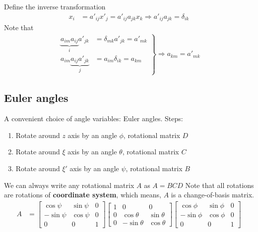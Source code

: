 \documentclass[twoside,9pt]{article}
\numberwithin{equation}{section} %
\theoremstyle{definition}
\theoremstyle{remark}
\begin{document}
Define the inverse transformation
\begin{align}
    x_i &= a'_{ij}x'_j = a'_{ij}a_{jk}x_k\Rightarrow
    a'_{ij}a_{jk} = \delta_{ik}
\end{align}
Note that
\begin{align}
    \left.
    \begin{aligned}
        \underbrace{a_{im}a_{ij}}_i a'_{jk} &= \delta_{mk}a'_{jk} = a'_{mk}\\
        a_{im}\underbrace{a_{ij}a'_{jk}}_j &= a_{im}\delta_{ik} = a_{km}
    \end{aligned}
    \right\}
    \Rightarrow a_{km} = a'_{mk}
\end{align}

\subsection{Euler angles}
A convenient choice of angle variables: Euler angles.
Steps:
\begin{enumerate}
    \item Rotate around $z$ axis by an angle $\phi$, rotational matrix $D$
    \item Rotate around $\xi$ axis by an angle $\theta$, rotational matrix $C$
    \item Rotate around $\xi'$ axis by an angle $\psi$, rotational matrix $B$
\end{enumerate}
We can always write any rotational matrix $A$ as $A = BCD$
Note that all rotations are rotations of \textbf{coordinate system}, which means,
$A$ is a change-of-basis matrix.
\begin{align}
    A &= 
    \begin{bmatrix}
        \cos\psi &  \sin\psi & 0\\
        -\sin\psi & \cos\psi & 0\\
        0 & 0 & 1
    \end{bmatrix}
    \begin{bmatrix}
        1 & 0 & 0\\
        0 & \cos\theta & \sin\theta \\
        0 & -\sin\theta & \cos\theta
    \end{bmatrix}
    \begin{bmatrix}
        \cos\phi & \sin\phi & 0\\
        -\sin\phi & \cos\phi & 0\\
        0 & 0 & 1
    \end{bmatrix}
\end{align}
\end{document}
